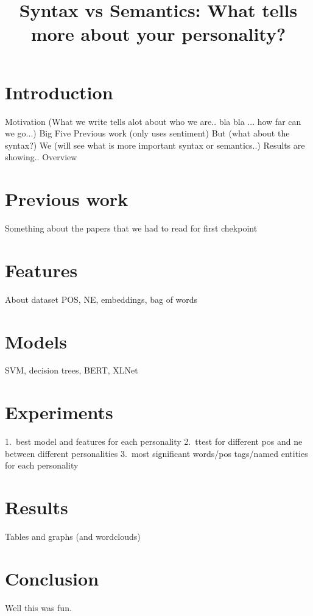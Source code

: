\documentclass[10pt, a4paper]{article}
\title{Syntax vs Semantics: What tells more about your personality?}
\begin{document}
\maketitleabstract

\section{Introduction}
Motivation (What we write tells alot about who we are.. bla bla ... how far can we go...)
Big Five
Previous work (only uses sentiment)
But (what about the syntax?)
We (will see what is more important syntax or semantics..)
Results are showing..
Overview

\section{Previous work}
Something about the papers that we had to read for first chekpoint

\section{Features}
About dataset
POS, NE, embeddings, bag of words

\section{Models}
SVM, decision trees, BERT, XLNet

\section{Experiments}
1.\ best model and features for each personality
2.\ ttest for different pos and ne between different personalities
3.\ most significant words/pos tags/named entities for each personality

\section{Results}
Tables and graphs (and wordclouds)

\section{Conclusion}
Well this was fun.



\end{document}
